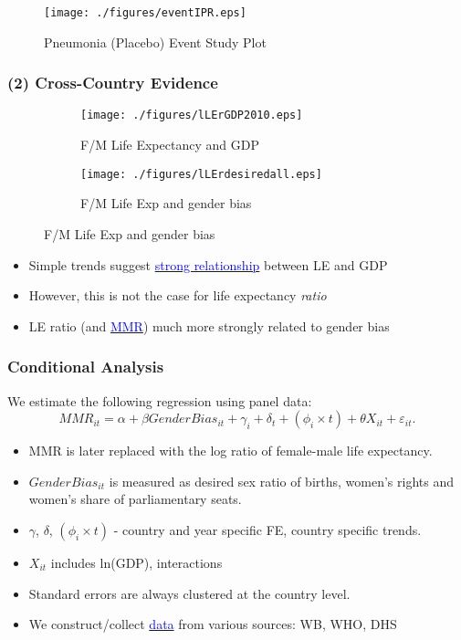 \documentclass[10pt,letterpaper,subeqn]{beamer}
\begin{document}
\begin{frame}
\begin{figure}
\caption{Pneumonia (Placebo) Event Study Plot}
\texttt{[image: ./figures/eventIPR.eps]}
\end{figure}
\end{frame}

\begin{frame}[label=CC1]
\frametitle{(2) Cross-Country Evidence}
\begin{figure}[htpb!]
\centering
\begin{subfigure}{.5\textwidth}
  \centering
  \texttt{[image: ./figures/lLErGDP2010.eps]}
  \caption{F/M Life Expectancy and GDP}
  \label{TWINfig:fertrend}
\end{subfigure}%
\begin{subfigure}{.5\textwidth}
  \centering
  \texttt{[image: ./figures/lLErdesiredall.eps]}
  \caption{F/M Life Exp and gender bias}
  \label{TWINfig:eductrend}
\end{subfigure}
\end{figure}
\begin{itemize}
\item Simple trends suggest \hyperlink{trends}{\textcolor{blue}{strong 
      relationship}} between LE and GDP
\item However, this is not the case for life expectancy \emph{ratio}
\item LE ratio (and \hyperlink{MMRBias}{\textcolor{blue}{MMR}}) much more 
      strongly related to gender bias
\end{itemize}
\end{frame}


\begin{frame}[label=CC]
\frametitle{Conditional Analysis}
We estimate the following regression using panel data:
	\begin{equation}
		MMR_{it} = \alpha + \beta GenderBias_{it} + \gamma_i + \delta_t + 
               (\phi_i\times t) + \theta X_{it} + \varepsilon_{it}. \nonumber
	\end{equation}
\begin{itemize}
	\item MMR is later replaced with the log ratio of female-male life expectancy.
  \item $GenderBias_{it}$ is measured as desired sex ratio of births, women's 
        rights and women's share of parliamentary seats.
	\item $\gamma$, $\delta$, $(\phi_i\times t)$ - country and year specific FE,
        country specific trends.  
  \item $X_{it}$ includes ln(GDP), interactions
	\item Standard errors are always clustered at the country level.
  \item We construct/collect \hyperlink{DSR}{\textcolor{blue}{data}} from various
        sources: WB, WHO, DHS
\end{itemize}
\end{frame}
\end{document}
